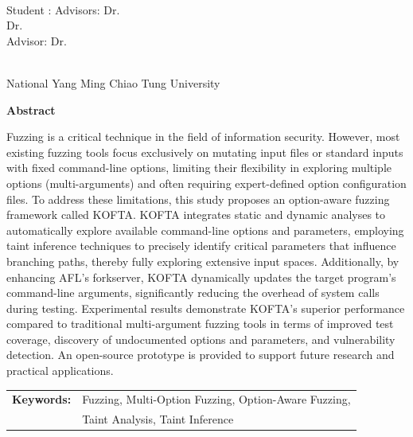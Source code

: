 \begin{center}
    \large
    
    \begin{singlespace}
        \textbf{\englishTitle{}} \\[0.5cm]
    \end{singlespace}
    
    \begin{singlespace}
        Student : \studentEnName{}  \hspace{1.0cm} 
        \ifdefined\advisorCnNameB
            Advisors: Dr.\, \advisorEnName \\
            \hspace{6.6cm} Dr.\, \advisorEnNameB  \\
        \else
            Advisor: Dr.\, \advisorEnName \\
        \fi
    \end{singlespace}
    
    \vspace{0.5cm}
    \begin{singlespace}
        \NameofDepartmentInstituteEN\\
        National Yang Ming Chiao Tung University\\[0.2cm]
    \end{singlespace}
    
    \textbf{Abstract} \\[0.5cm]

\end{center}

\normalsize 
  
Fuzzing is a critical technique in the field of information security. However, most existing fuzzing tools focus exclusively on mutating input files or standard inputs with fixed command-line options, limiting their flexibility in exploring multiple options (multi-arguments) and often requiring expert-defined option configuration files. To address these limitations, this study proposes an option-aware fuzzing framework called KOFTA. KOFTA integrates static and dynamic analyses to automatically explore available command-line options and parameters, employing taint inference techniques to precisely identify critical parameters that influence branching paths, thereby fully exploring extensive input spaces. Additionally, by enhancing AFL's forkserver, KOFTA dynamically updates the target program's command-line arguments, significantly reducing the overhead of system calls during testing. Experimental results demonstrate KOFTA's superior performance compared to traditional multi-argument fuzzing tools in terms of improved test coverage, discovery of undocumented options and parameters, and vulnerability detection. An open-source prototype is provided to support future research and practical applications.

\vspace{1cm}

\begin{tabular}{r l}
\textbf{Keywords:} &Fuzzing, Multi-Option Fuzzing, Option-Aware Fuzzing, \\
                   &Taint Analysis, Taint Inference
\end{tabular}
